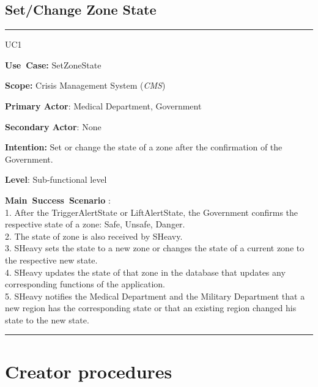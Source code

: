 \subsection{Set/Change Zone State}
\vspace{0.5cm}
\hrule
\vspace{0.5cm}
\begin{lyxlist}{UC1}
\small{
\item [\textbf{Use~Case:}] SetZoneState
\item [\textbf{Scope:}] Crisis Management System (\emph{CMS})
\item [\textbf{Primary Actor}:] Medical Department, Government
\item [\textbf{Secondary Actor}:] None
\item [\textbf{Intention:}] Set or change the state of a zone 
after the confirmation of the Government.
\item [\textbf{Level}:]Sub-functional level
\item [\textbf{Main~Success~Scenario}]:\\
1. After the TriggerAlertState or LiftAlertState, the Government confirms
 the respective state of a zone: Safe, Unsafe, Danger.\\
2. The state of zone is also received by SHeavy.\\
3. SHeavy sets the state to a new zone or changes the state of a current zone to 
the respective new state.\\
4. SHeavy updates the state of that zone in the database that updates any
corresponding functions of the application.\\
5. SHeavy notifies the Medical Department and the Military Department that a new 
region has the corresponding state or that an existing region changed his state
to the new state.\\
}
\end{lyxlist}
\hrule
\vspace{0.5cm} 

\section{Creator procedures}

